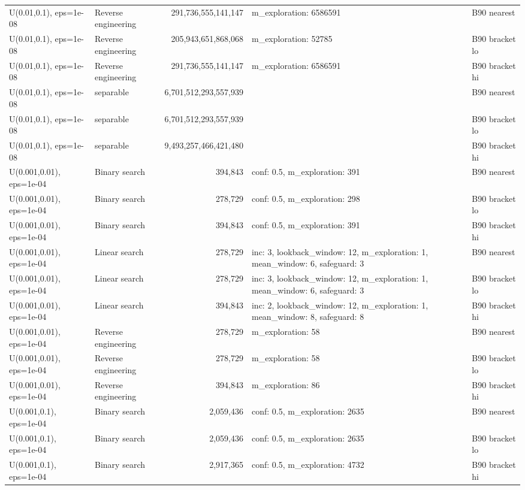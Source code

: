\begin{tabular}{llrll}
U(0.01,0.1), eps=1e-08 & Reverse engineering & 291,736,555,141,147 & m\_exploration: 6586591 & B90 nearest \\
U(0.01,0.1), eps=1e-08 & Reverse engineering & 205,943,651,868,068 & m\_exploration: 52785 & B90 bracket lo \\
U(0.01,0.1), eps=1e-08 & Reverse engineering & 291,736,555,141,147 & m\_exploration: 6586591 & B90 bracket hi \\
U(0.01,0.1), eps=1e-08 & separable & 6,701,512,293,557,939 &  & B90 nearest \\
U(0.01,0.1), eps=1e-08 & separable & 6,701,512,293,557,939 &  & B90 bracket lo \\
U(0.01,0.1), eps=1e-08 & separable & 9,493,257,466,421,480 &  & B90 bracket hi \\
U(0.001,0.01), eps=1e-04 & Binary search & 394,843 & conf: 0.5, m\_exploration: 391 & B90 nearest \\
U(0.001,0.01), eps=1e-04 & Binary search & 278,729 & conf: 0.5, m\_exploration: 298 & B90 bracket lo \\
U(0.001,0.01), eps=1e-04 & Binary search & 394,843 & conf: 0.5, m\_exploration: 391 & B90 bracket hi \\
U(0.001,0.01), eps=1e-04 & Linear search & 278,729 & inc: 3, lookback\_window: 12, m\_exploration: 1, mean\_window: 6, safeguard: 3 & B90 nearest \\
U(0.001,0.01), eps=1e-04 & Linear search & 278,729 & inc: 3, lookback\_window: 12, m\_exploration: 1, mean\_window: 6, safeguard: 3 & B90 bracket lo \\
U(0.001,0.01), eps=1e-04 & Linear search & 394,843 & inc: 2, lookback\_window: 12, m\_exploration: 1, mean\_window: 8, safeguard: 8 & B90 bracket hi \\
U(0.001,0.01), eps=1e-04 & Reverse engineering & 278,729 & m\_exploration: 58 & B90 nearest \\
U(0.001,0.01), eps=1e-04 & Reverse engineering & 278,729 & m\_exploration: 58 & B90 bracket lo \\
U(0.001,0.01), eps=1e-04 & Reverse engineering & 394,843 & m\_exploration: 86 & B90 bracket hi \\
U(0.001,0.1), eps=1e-04 & Binary search & 2,059,436 & conf: 0.5, m\_exploration: 2635 & B90 nearest \\
U(0.001,0.1), eps=1e-04 & Binary search & 2,059,436 & conf: 0.5, m\_exploration: 2635 & B90 bracket lo \\
U(0.001,0.1), eps=1e-04 & Binary search & 2,917,365 & conf: 0.5, m\_exploration: 4732 & B90 bracket hi \\

\end{tabular}

